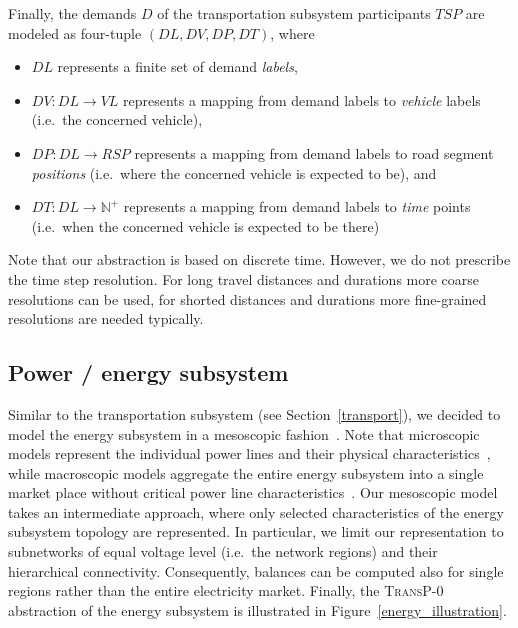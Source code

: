 Finally, the demands $D$ of the transportation subsystem participants $TSP$ are modeled as four-tuple $(DL, DV, DP, DT)$, where
\begin{itemize}
	\item $DL$ represents a finite set of demand \textit{labels},
	\item $DV: DL \rightarrow VL$ represents a mapping from demand labels to \textit{vehicle} labels (i.e.\ the concerned vehicle),
	\item $DP: DL \rightarrow RSP$ represents a mapping from demand labels to road segment \textit{positions} (i.e.\ where the concerned vehicle is expected to be), and
	\item $DT: DL \rightarrow \mathbb{N}^+$ represents a mapping from demand labels to \textit{time} points (i.e.\ when the concerned vehicle is expected to be there)
\end{itemize}
Note that our abstraction is based on discrete time. However, we do not prescribe the time step resolution. For long travel distances and durations more coarse resolutions can be used, for shorted distances and durations more fine-grained resolutions are needed typically.

\subsection{Power / energy subsystem}
\label{energy_system}

Similar to the transportation subsystem (see Section~\ref{transport}), we decided to model the energy subsystem in a mesoscopic fashion~\cite{Hackenberg2012}. Note that microscopic models represent the individual power lines and their physical characteristics~\cite{Dommel1968}, while macroscopic models aggregate the entire energy subsystem into a single market place without critical power line characteristics~\cite{Castronuovo2004}. Our mesoscopic model takes an intermediate approach, where only selected characteristics of the energy subsystem topology are represented. In particular, we limit our representation to subnetworks of equal voltage level (i.e.\ the network regions) and their hierarchical connectivity. Consequently, balances can be computed also for single regions rather than the entire electricity market. Finally, the \textsc{TransP-0} abstraction of the energy subsystem is illustrated in Figure~\ref{energy_illustration}.

